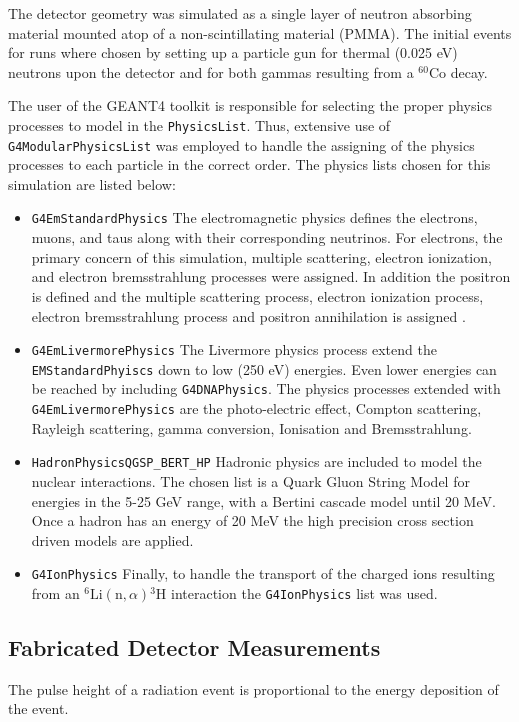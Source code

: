 \documentclass{anstrans}
\newcommand{\iso}[2]{${}^{#2}${#1}}
\begin{document}
The detector geometry was simulated as a single layer of neutron absorbing material mounted atop of a non-scintillating material (PMMA).
The initial events for runs where chosen by setting up a particle gun for thermal (0.025 eV) neutrons upon the detector and for both gammas resulting from a \iso{Co}{60} decay.

The user of the GEANT4 toolkit is responsible for selecting the proper physics processes to model in the \verb+PhysicsList+.
Thus, extensive use of \verb+G4ModularPhysicsList+ was employed to handle the assigning of the physics processes to each particle in the correct order.
The physics lists chosen for this simulation are listed below:
\begin{itemize}
    \item \verb+G4EmStandardPhysics+ The electromagnetic physics defines the electrons, muons, and taus along with their corresponding neutrinos. For electrons, the primary concern of this simulation, multiple scattering, electron ionization, and electron bremsstrahlung processes were assigned.  In addition the positron is defined and the multiple scattering process, electron ionization process, electron bremsstrahlung process and positron annihilation is assigned \cite{cern_physics_2012}.
    \item \verb+G4EmLivermorePhysics+ The Livermore physics process extend the \verb+EMStandardPhyiscs+ down to low (250 eV) energies. Even lower energies can be reached by including \verb+G4DNAPhysics+. The physics processes extended with \verb+G4EmLivermorePhysics+ are the photo-electric effect, Compton scattering, Rayleigh scattering, gamma conversion, Ionisation and Bremsstrahlung\cite{cern_physics_2012}. 
    \item \verb+HadronPhysicsQGSP_BERT_HP+ Hadronic physics are included to model the nuclear interactions. The chosen list is a Quark Gluon String Model for energies in the 5-25 GeV range, with a Bertini cascade model until 20 MeV.  Once a hadron has an energy of 20 MeV the high precision cross section driven models are applied\cite{cern_reference_2008}.
    \item \verb+G4IonPhysics+ Finally, to handle the transport of the charged ions resulting from an ${}^6\text{Li}(\text{n},\alpha){}^{3}\text{H}$ interaction the \verb+G4IonPhysics+ list was used.
\end{itemize}


\subsection{Fabricated Detector Measurements}
The pulse height of a radiation event is proportional to the energy deposition of the event\cite{birks_scintillations_1951}.
\end{document}
